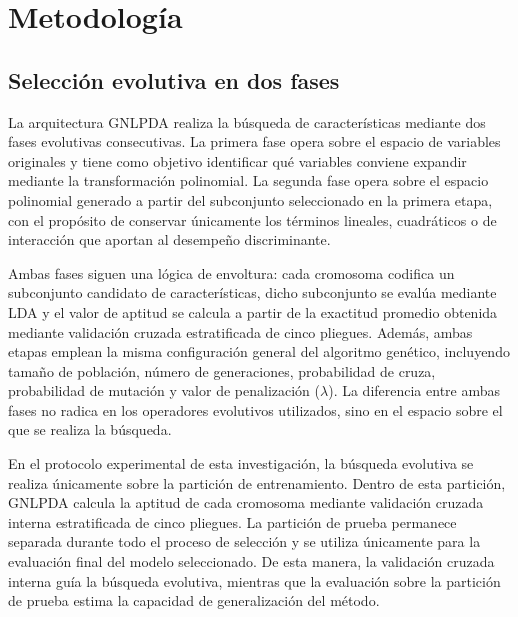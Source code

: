 
\chapter{Metodología}
\label{chap:Metodología}

\section{Selección evolutiva en dos fases}

La arquitectura GNLPDA realiza la búsqueda de características mediante dos fases evolutivas consecutivas. La primera fase opera sobre el espacio de variables originales y tiene como objetivo identificar qué variables conviene expandir mediante la transformación polinomial. La segunda fase opera sobre el espacio polinomial generado a partir del subconjunto seleccionado en la
primera etapa, con el propósito de conservar únicamente los términos lineales, cuadráticos o
de interacción que aportan al desempeño discriminante.

Ambas fases siguen una lógica de envoltura: cada cromosoma codifica un subconjunto candidato de características, dicho subconjunto se evalúa mediante LDA y el valor de aptitud se calcula a partir de la exactitud promedio obtenida mediante validación cruzada estratificada de cinco pliegues. Además, ambas etapas emplean la misma configuración general del algoritmo genético, incluyendo tamaño de población, número de generaciones, probabilidad de cruza, probabilidad de mutación y valor de penalización ($\lambda$). La diferencia entre ambas fases no radica en los operadores evolutivos utilizados, sino en el espacio sobre el que se realiza la búsqueda.

En el protocolo experimental de esta investigación, la búsqueda evolutiva se realiza
únicamente sobre la partición de entrenamiento. Dentro de esta partición, GNLPDA calcula
la aptitud de cada cromosoma mediante validación cruzada interna estratificada de cinco pliegues. La partición de prueba permanece separada durante todo el proceso de selección y se utiliza únicamente para la evaluación final del modelo seleccionado. De esta manera, la
validación cruzada interna guía la búsqueda evolutiva, mientras que la evaluación sobre la partición de prueba estima la capacidad de generalización del método.

